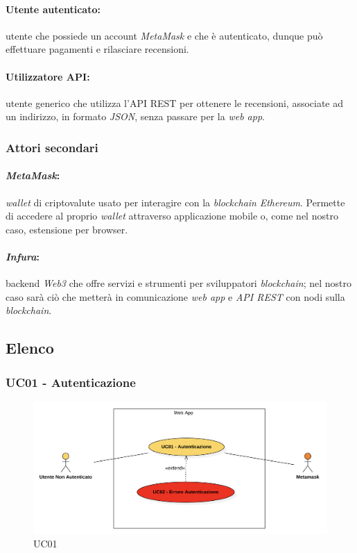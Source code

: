             \paragraph*{Utente autenticato:} utente che possiede un account \textit{MetaMask} e che è autenticato, dunque può effettuare pagamenti e rilasciare recensioni.

            \paragraph*{Utilizzatore API:} utente generico che utilizza l'API REST per ottenere le recensioni, associate ad un indirizzo, in formato \textit{JSON}, senza passare per la \textit{web app}.

        \subsubsection{Attori secondari}
            \paragraph*{\textit{MetaMask}:} \textit{wallet}\glo \: di criptovalute usato per interagire con la \textit{blockchain} \textit{Ethereum}. Permette di accedere al proprio \textit{wallet} attraverso applicazione mobile o, come nel nostro caso, estensione per browser.

            \paragraph*{\textit{Infura}\glo :} backend \textit{Web3}\glo \: che offre servizi e strumenti per sviluppatori \textit{blockchain}; nel nostro caso sarà ciò che metterà in comunicazione \textit{web app} e \textit{API REST} con nodi\glo \: sulla \textit{blockchain}.

    \subsection{Elenco}

        \subsubsection{UC01 - Autenticazione}
        \label{UC01}

            \begin{figure}[H]
                \centering
                \includegraphics[scale=0.6]{src/img/UC01.png}
                \caption{UC01}
            \end{figure}

